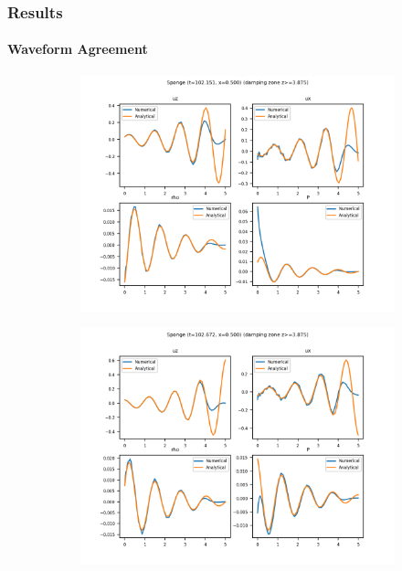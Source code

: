 \documentclass[dvipsnames]{beamer}
\begin{document}
\begin{frame}
    \frametitle{Results}
    \framesubtitle{Waveform Agreement}

    \begin{figure}[!h]
        \centering
        \begin{subfigure}{0.4\textwidth}
            \centering
            \includegraphics[width=\textwidth]{../sims/2d_strat/agree_plots/sponge_0.png}
        \end{subfigure}
        \begin{subfigure}{0.4\textwidth}
            \centering
            \includegraphics[width=\textwidth]{../sims/2d_strat/agree_plots/sponge_1.png}
        \end{subfigure}


\end{figure}
\end{frame}
\end{document}
